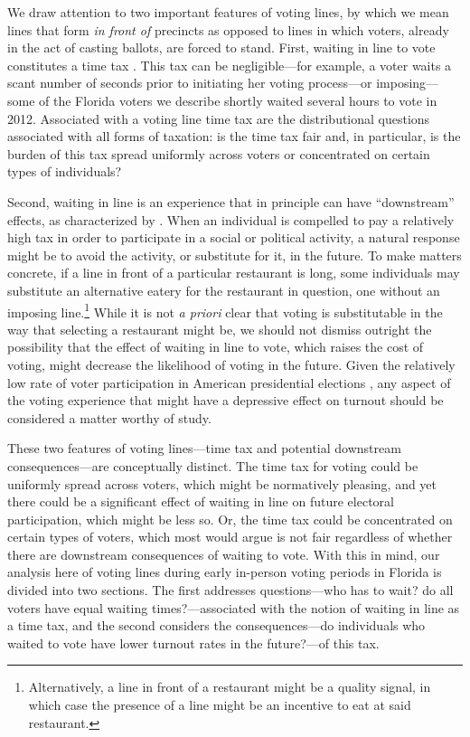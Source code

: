 \documentclass[12pt,titlepage]{article}
\begin{document}

We draw attention to two important features of voting lines, by which
we mean lines that form \emph{in front of} precincts as opposed to
lines in which voters, already in the act of casting ballots, are
forced to stand.  First, waiting in line to vote constitutes a time
tax \citep{mukherjee:timetax}.  This tax can be negligible---for
example, a voter waits a scant number of seconds prior to initiating
her voting process---or imposing---some of the Florida voters we
describe shortly waited several hours to vote in 2012.  Associated
with a voting line time tax are the distributional questions
associated with all forms of taxation: is the time tax fair and, in
particular, is the burden of this tax spread uniformly across voters
or concentrated on certain types of individuals?

Second, waiting in line is an experience that in principle can have 
``downstream'' effects, as characterized by
\citet{pettigrew:longlinesminorityprecincts}. When an individual is
compelled to pay a relatively high tax in order to participate in a
social or political activity, a natural response might be to avoid the
activity, or substitute for it, in the future. To make matters
concrete, if a line in front of a particular restaurant is long, some
individuals may substitute an alternative eatery for the restaurant in
question, one without an imposing line.\footnote{Alternatively, a line
  in front of a restaurant might be a quality signal, in which case
  the presence of a line might be an incentive to eat at said
  restaurant.}  While it is not \emph{a priori} clear that voting is
substitutable in the way that selecting a restaurant might be, we
should not dismiss outright the possibility that the effect of waiting
in line to vote, which raises the cost of voting, might decrease the
likelihood of voting in the future.  Given the relatively low rate of
voter participation in American presidential elections
\citep{IDEA:turnout}, any aspect of the voting experience that might
have a depressive effect on turnout should be considered a matter
worthy of study.

These two features of voting lines---time tax and potential downstream
consequences---are conceptually distinct. The time tax for voting
could be uniformly spread across voters, which might be normatively
pleasing, and yet there could be a significant effect of waiting in
line on future electoral participation, which might be less so. Or,
the time tax could be concentrated on certain types of voters, which
most would argue is not fair regardless of whether there are
downstream consequences of waiting to vote. With this in mind, our
analysis here of voting lines during early in-person voting periods in
Florida is divided into two sections. The first addresses
questions---who has to wait?  do all voters have equal waiting
times?---associated with the notion of waiting in line as a time tax,
and the second considers the consequences---do individuals who waited
to vote have lower turnout rates in the future?---of this tax.
\end{document}
